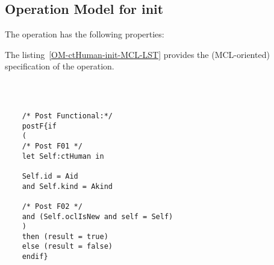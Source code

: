 \subsection{Operation Model for init}

\label{OM-init}


The  operation has the following properties:

	\begin{operationmodel}



		


	\end{operationmodel}



	\vspace{1cm}
	The listing~\ref{OM-ctHuman-init-MCL-LST} provides the \msrmessir (MCL-oriented) specification of the operation.
	
	\scriptsize
	\vspace{0.5cm}
	\begin{lstlisting}[style=MessirStyle,firstnumber=auto,captionpos=b,caption={\msrmessir (MCL-oriented) specification of the operation \emph{init}.},label=OM-ctHuman-init-MCL-LST]

	
	
	/* Post Functional:*/ 
	postF{if
	(
	/* Post F01 */
	let Self:ctHuman in
	
	Self.id = Aid
	and Self.kind = Akind
	
	/* Post F02 */
	and (Self.oclIsNew and self = Self)
	)
	then (result = true)
	else (result = false)
	endif}
	
	
	\end{lstlisting}
	\normalsize 
	
	
	
	





